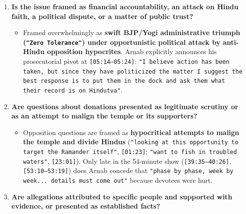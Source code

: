 \documentclass[10pt,a4paper]{article}
\begin{document}
\begin{enumerate}[leftmargin=1.6em, itemsep=4pt, topsep=4pt]
\begin{itemize}[leftmargin=1.4em, itemsep=2pt, topsep=2pt]
    \item \textbf{Donors:} Devotees who \texttt{"throng the Aayodhya Ram mandr"} (\texttt{[06:02]}) and \texttt{"contributed, fought for 500 years"} (\texttt{[35:52--36:02]}), exemplified in VTR by a devotee proclaiming \texttt{"I will never lose faith in Ram because of some selfish people"} (\texttt{[09:19--09:30]}).
    \item \textbf{People Making Allegations:} Demonized en masse in the opening monologue as \texttt{"People who say let's divide Hindus... People who did not want the Ram mandr itself... People who said Lord Ram did never exist"} (\texttt{[01:23--01:52]}), \texttt{"don't have the asta [faith] to visit the Ram temple"} (\texttt{[04:18]}), and heirs to Mulayam Singh Yadav's \texttt{"GENOCIDE OF CAR SEAKS"} (\texttt{[04:47--05:06]}).
  \end{itemize}
  \item \textbf{Is the issue framed as financial accountability, an attack on Hindu faith, a political dispute, or a matter of public trust?}
  \begin{itemize}[leftmargin=1.4em, itemsep=2pt, topsep=2pt]
    \item Framed overwhelmingly as \textbf{swift BJP/Yogi administrative triumph (\texttt{"Zero Tolerance"}) under opportunistic political attack by anti-Hindu opposition hypocrites}. Arnab explicitly announces his prosecutorial pivot at \texttt{[05:14--05:24]}: \texttt{"I believe action has been taken, but since they have politicized the matter I suggest the best response is to put them in the dock and ask them what their record is on Hindutva"}.
  \end{itemize}
  \item \textbf{Are questions about donations presented as legitimate scrutiny or as an attempt to malign the temple or its supporters?}
  \begin{itemize}[leftmargin=1.4em, itemsep=2pt, topsep=2pt]
    \item Opposition questions are framed as \textbf{hypocritical attempts to malign the temple and divide Hindus} (\texttt{"looking at this opportunity to target the Ramander itself"}, \texttt{[01:23]}; \texttt{"want to fish in troubled waters"}, \texttt{[23:01]}). Only late in the 54-minute show (\texttt{[39:35--40:26]}, \texttt{[53:10--53:19]}) does Arnab concede that \texttt{"phase by phase, week by week... details must come out"} because devotees were hurt.
  \end{itemize}
  \item \textbf{Are allegations attributed to specific people and supported with evidence, or presented as established facts?}

\end{enumerate}
\end{document}
